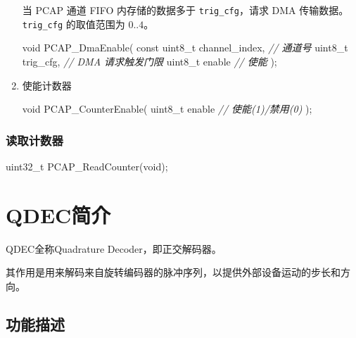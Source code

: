 \documentclass[
  12pt,
]{book}
\newenvironment{Shaded}{\begin{snugshade}}{\end{snugshade}}
\newcommand{\CommentTok}[1]{\textcolor[rgb]{0.56,0.35,0.01}{\textit{#1}}}
\newcommand{\DataTypeTok}[1]{\textcolor[rgb]{0.13,0.29,0.53}{#1}}
\newcommand{\NormalTok}[1]{#1}
\begin{document}
\begin{enumerate}
  当 PCAP 通道 FIFO 内存储的数据多于 \texttt{trig\_cfg}，请求 DMA 传输数据。\texttt{trig\_cfg} 的取值范围为 \(0..4\)。

\begin{Shaded}
\begin{Highlighting}[]
\DataTypeTok{void}\NormalTok{ PCAP_DmaEnable(}
    \DataTypeTok{const} \DataTypeTok{uint8_t}\NormalTok{ channel_index, }\CommentTok{// 通道号}
    \DataTypeTok{uint8_t}\NormalTok{ trig_cfg,            }\CommentTok{// DMA 请求触发门限}
    \DataTypeTok{uint8_t}\NormalTok{ enable               }\CommentTok{// 使能}
\NormalTok{    );}
\end{Highlighting}
\end{Shaded}
\item
  使能计数器

\begin{Shaded}
\begin{Highlighting}[]
\DataTypeTok{void}\NormalTok{ PCAP_CounterEnable(}
    \DataTypeTok{uint8_t}\NormalTok{ enable              }\CommentTok{// 使能(1)/禁用(0)}
\NormalTok{    );}
\end{Highlighting}
\end{Shaded}
\end{enumerate}

\hypertarget{ux8bfbux53d6ux8ba1ux6570ux5668}{%
\subsection{读取计数器}\label{ux8bfbux53d6ux8ba1ux6570ux5668}}

\begin{Shaded}
\begin{Highlighting}[]
\DataTypeTok{uint32_t}\NormalTok{ PCAP_ReadCounter(}\DataTypeTok{void}\NormalTok{);}
\end{Highlighting}
\end{Shaded}

\hypertarget{ch-qdec}{%
\chapter{QDEC简介}\label{ch-qdec}}

QDEC全称Quadrature Decoder，即正交解码器。

其作用是用来解码来自旋转编码器的脉冲序列，以提供外部设备运动的步长和方向。

\hypertarget{ux529fux80fdux63cfux8ff0-5}{%
\section{功能描述}\label{ux529fux80fdux63cfux8ff0-5}}
\end{document}
